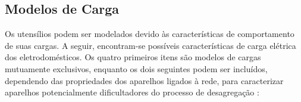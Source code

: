 \subsection{Modelos de Carga}
\label{ssec:modelos_carga}

Os utensílios podem ser modelados devido às características de
comportamento de suas cargas. A seguir, encontram-se possíveis
características de carga elétrica dos eletrodomésticos. Os quatro
primeiros itens são modelos de cargas mutuamente exclusivos, enquanto
os dois seguintes podem ser incluídos, dependendo das propriedades dos
aparelhos ligados à rede, para caracterizar aparelhos potencialmente
dificultadores do processo de desagregação \cite[com adaptações]{
nilm_hart_1992_8,nilm_baranski_genetic_base_2003_19,
nilm_zeifman_review_2011,nilm_zeifman_vast_hisample_pdfmerge_2011,
nilm_apresentacao_review_2011,nilm_liang_pt2_2010_40,
nilm_liang_pt1_2010_34}:

